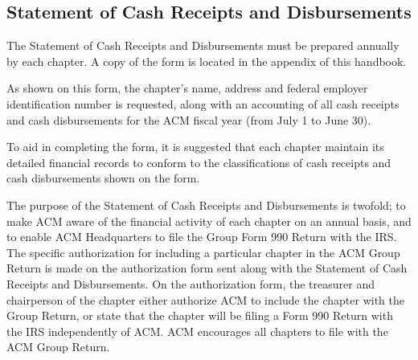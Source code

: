 \subsection{Statement of Cash Receipts and Disbursements}
The Statement of Cash Receipts and Disbursements must be prepared annually by each chapter. A copy of the form is located in the appendix of this handbook.

As shown on this form, the chapter's name, address and federal employer identification number is requested, along with an accounting of all cash receipts and cash disbursements for the ACM fiscal year (from July 1 to June 30).

To aid in completing the form, it is suggested that each chapter maintain its detailed financial records to conform to the classifications of cash receipts and cash disbursements shown on the form.

The purpose of the Statement of Cash Receipts and Disbursements is twofold; to make ACM aware of the financial activity of each chapter on an annual basis, and to enable ACM Headquarters to file the Group Form 990 Return with the IRS. The specific authorization for including a particular chapter in the ACM Group Return is made on the authorization form sent along with the Statement of Cash Receipts and Disbursements. On the authorization form, the treasurer and chairperson of the chapter either authorize ACM to include the chapter with the Group Return, or state that the chapter will be filing a Form 990 Return with the IRS independently of ACM. ACM encourages all chapters to file with the ACM Group Return.

